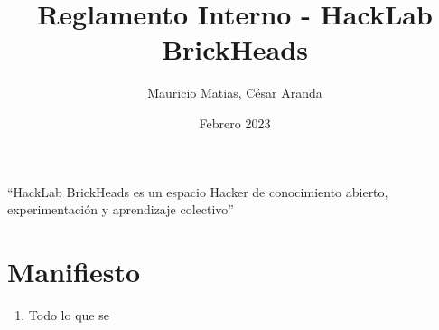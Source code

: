\documentclass[12pt, letterpaper]{article}
\title{Reglamento Interno - HackLab BrickHeads}
\author{Mauricio Matias, César Aranda}
\date{Febrero 2023}
\begin{document}
    \maketitle
    ``HackLab BrickHeads es un espacio Hacker de conocimiento abierto, experimentación y aprendizaje colectivo''


    \section{Manifiesto}

    \begin{enumerate}
        \item Todo lo que se 
    \end{enumerate}
\end{document}
